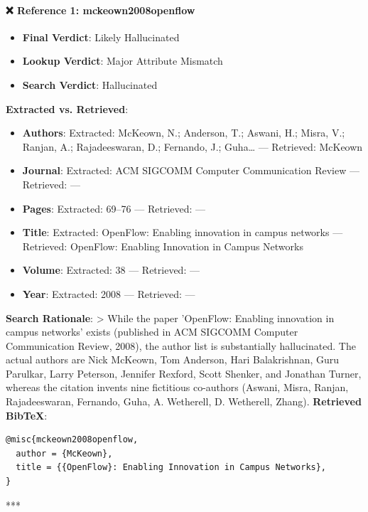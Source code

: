 \documentclass[11pt,a4paper]{article}
\begin{document}
\paragraph{❌ Reference 1: mckeown2008openflow}
\begin{itemize}[leftmargin=1.8em,itemsep=2pt]
\item \textbf{Final Verdict}: Likely Hallucinated
\item \textbf{Lookup Verdict}: Major Attribute Mismatch
\item \textbf{Search Verdict}: Hallucinated
\end{itemize}
\textbf{Extracted vs. Retrieved}:
\begin{itemize}[leftmargin=1.8em,itemsep=2pt]
\item \textbf{Authors}: Extracted: McKeown, N.; Anderson, T.; Aswani, H.; Misra, V.; Ranjan, A.; Rajadeeswaran, D.; Fernando, J.; Guha… — Retrieved: McKeown
\item \textbf{Journal}: Extracted: ACM SIGCOMM Computer Communication Review — Retrieved: —
\item \textbf{Pages}: Extracted: 69–76 — Retrieved: —
\item \textbf{Title}: Extracted: OpenFlow: Enabling innovation in campus networks — Retrieved: OpenFlow: Enabling Innovation in Campus Networks
\item \textbf{Volume}: Extracted: 38 — Retrieved: —
\item \textbf{Year}: Extracted: 2008 — Retrieved: —
\end{itemize}
\textbf{Search Rationale}:
> While the paper 'OpenFlow: Enabling innovation in campus networks' exists (published in ACM SIGCOMM Computer Communication Review, 2008), the author list is substantially hallucinated. The actual authors are Nick McKeown, Tom Anderson, Hari Balakrishnan, Guru Parulkar, Larry Peterson, Jennifer Rexford, Scott Shenker, and Jonathan Turner, whereas the citation invents nine fictitious co-authors (Aswani, Misra, Ranjan, Rajadeeswaran, Fernando, Guha, A. Wetherell, D. Wetherell, Zhang).
\textbf{Retrieved BibTeX}:
\begin{Verbatim}[fontsize=\small]
@misc{mckeown2008openflow,
  author = {McKeown},
  title = {{OpenFlow}: Enabling Innovation in Campus Networks},
}
\end{Verbatim}
***
\end{document}
